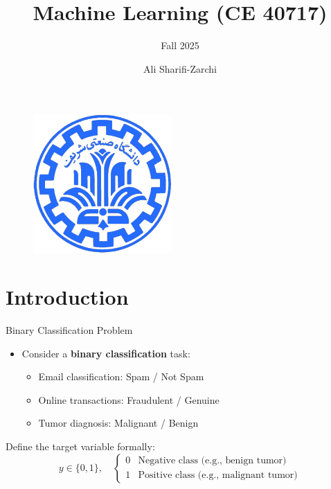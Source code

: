 \documentclass[serif, aspectratio=169]{beamer}
\author{Ali Sharifi-Zarchi}
\title{Machine Learning (CE 40717)}
\subtitle{Fall 2025}
\institute{
    CE Department \\
    Sharif University of Technology
}
\begin{document}
\begin{frame}
    \titlepage
    \vspace*{-0.6cm}
    \begin{figure}[htpb]
        \begin{center}
            \includegraphics[keepaspectratio, scale=0.25]{pic/sharif-main-logo.png}
        \end{center}
    \end{figure}
    \vfill %
    \vspace{-0.35cm}
\end{frame}

\begin{frame}    
\tableofcontents[sectionstyle=show,
subsectionstyle=show/shaded/hide,
subsubsectionstyle=show/shaded/hide]
\end{frame}


\section{Introduction}

\begin{frame}{Binary Classification Problem}
    \begin{itemize}
        \item Consider a \textbf{binary classification} task:
        \begin{itemize}
            \item Email classification: Spam / Not Spam
            \item Online transactions: Fraudulent / Genuine
            \item Tumor diagnosis: Malignant / Benign
        \end{itemize}
    \end{itemize}

    \vspace{0.5em}
    Define the target variable formally:
    \[
        y \in \{0, 1\}, \quad
        \begin{cases}
            0 & \text{Negative class (e.g., benign tumor)}\\
            1 & \text{Positive class (e.g., malignant tumor)}
        \end{cases}
    \]
\end{frame}
\end{document}

